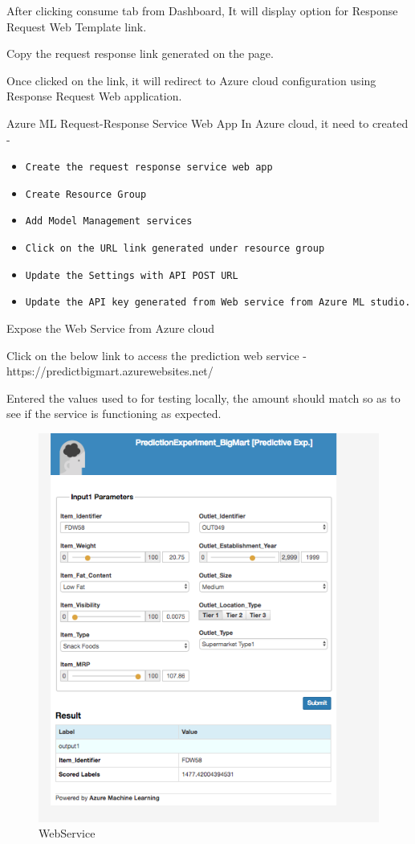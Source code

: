 After clicking consume tab from Dashboard, It will display option for Response Request Web 
Template link.

Copy the request response link generated on the page.

Once clicked on the link, it will redirect to Azure cloud configuration using Response Request 
Web application.

Azure ML Request-Response Service Web App
In Azure cloud, it need to created -

\begin{itemize}
\item \verb|Create the request response service web app|
\item \verb|Create Resource Group|
\item \verb|Add Model Management services|
\item \verb|Click on the URL link generated under resource group|
\item \verb|Update the Settings with API POST URL|
\item \verb|Update the API key generated from Web service from Azure ML studio.|
\end{itemize}

Expose the Web Service from Azure cloud

Click on the below link to access the prediction web service - 
https://predictbigmart.azurewebsites.net/

Entered the values used to for testing locally, the amount should match so as to see if the 
service is functioning as expected.

\begin{figure}[pic8]
	\centering\includegraphics[width=\columnwidth]{Images/mlstudio/WebService.png}
	\caption{WebService}\label{fig:WebService}
\end{figure}

